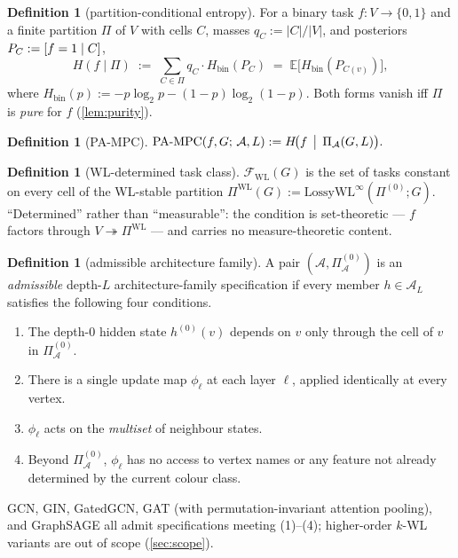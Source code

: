 \documentclass[10pt]{article}
\theoremstyle{definition}
\newtheorem{definition}[theorem]{Definition}
\theoremstyle{remark}
\newcommand{\Hbin}{H_{\mathrm{bin}}}
\newcommand{\PAMPC}{\operatorname{PA\text{-}MPC}}
\let\Pr\relax
\DeclareMathOperator{\Pr}{\mathbb{P}}
\newcommand{\E}{\mathbb{E}}
\newcommand{\LossyWL}{\mathrm{LossyWL}}
\newcommand{\Fwl}{\mathcal{F}_{\mathrm{WL}}}
\newcommand{\PiA}{\Pi_{\mathcal{A}}}
\newcommand{\WL}{\mathrm{WL}}
\begin{document}
\begin{definition}[partition-conditional entropy]\label{def:pce}
For a binary task $f : V \to \{0,1\}$ and a finite partition $\Pi$
of $V$ with cells $C$, masses $q_C := |C|/|V|$, and posteriors
$P_C := \Pr[f = 1 \mid C]$,
\[
  H(f \mid \Pi) \;:=\; \sum_{C \in \Pi} q_C \cdot \Hbin(P_C)
  \;=\; \E\!\bigl[\Hbin(P_{C(v)})\bigr],
\]
where $\Hbin(p) := -p\log_2 p - (1-p)\log_2(1-p)$. Both forms
vanish iff $\Pi$ is \emph{pure} for $f$ (\cref{lem:purity}).
\end{definition}

\begin{definition}[PA-MPC]\label{def:pampc}
$\PAMPC(f, G;\, \mathcal{A}, L) := H\!\bigl(f \,\bigm|\, \PiA(G, L)\bigr).$
\end{definition}

\begin{definition}[WL-determined task class]\label{def:wldet}
$\Fwl(G)$ is the set of tasks constant on every cell of the
WL-stable partition $\Pi^{\WL}(G) := \LossyWL^{\infty}(\Pi^{(0)}; G)$.
``Determined'' rather than ``measurable'': the condition is
set-theoretic --- $f$ factors through $V \twoheadrightarrow \Pi^{\WL}$
--- and carries no measure-theoretic content.
\end{definition}

\begin{definition}[admissible architecture family]\label{def:admissible}
A pair $(\mathcal{A}, \Pi^{(0)}_{\mathcal{A}})$ is an \emph{admissible}
depth-$L$ architecture-family specification if every member
$h \in \mathcal{A}_L$ satisfies the following four conditions.
\begin{enumerate}[(1)]
  \item The depth-0 hidden state $h^{(0)}(v)$ depends on $v$ only
    through the cell of $v$ in $\Pi^{(0)}_{\mathcal{A}}$.
  \item There is a single update map $\phi_\ell$ at each layer
    $\ell$, applied identically at every vertex.
  \item $\phi_\ell$ acts on the \emph{multiset} of neighbour states.
  \item Beyond $\Pi^{(0)}_{\mathcal{A}}$, $\phi_\ell$ has no access
    to vertex names or any feature not already determined by the
    current colour class.
\end{enumerate}
GCN, GIN, GatedGCN, GAT (with permutation-invariant attention
pooling), and GraphSAGE all admit specifications meeting (1)--(4);
higher-order $k$-WL variants are out of scope (\cref{sec:scope}).
\end{definition}
\end{document}
